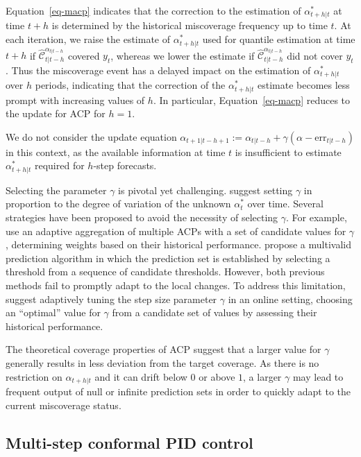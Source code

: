 \documentclass[
  11pt,
  a4paper,
]{article}
\theoremstyle{plain}
\theoremstyle{remark}
\begin{document}
Equation~\ref{eq-macp} indicates that the correction to the estimation
of \(\alpha_{t+h|t}^{*}\) at time \(t+h\) is determined by the
historical miscoverage frequency up to time \(t\). At each iteration, we
raise the estimate of \(\alpha_{t+h|t}^{*}\) used for quantile
estimation at time \(t+h\) if
\(\hat{\mathcal{C}}_{t|t-h}^{\alpha_{t|t-h}}\) covered \(y_t\), whereas
we lower the estimate if \(\hat{\mathcal{C}}_{t|t-h}^{\alpha_{t|t-h}}\)
did not cover \(y_t\). Thus the miscoverage event has a delayed impact
on the estimation of \(\alpha_{t+h|t}^{*}\) over \(h\) periods,
indicating that the correction of the \(\alpha_{t+h|t}^{*}\) estimate
becomes less prompt with increasing values of \(h\). In particular,
Equation~\ref{eq-macp} reduces to the update for ACP for \(h=1\).

We do not consider the update equation
\(\alpha_{t+1|t-h+1} := \alpha_{t|t-h} + \gamma(\alpha - \mathrm{err}_{t|t-h})\)
in this context, as the available information at time \(t\) is
insufficient to estimate \(\alpha_{t+h|t}^{*}\) required for \(h\)-step
forecasts.

Selecting the parameter \(\gamma\) is pivotal yet challenging.
\textcite{gibbs2021} suggest setting \(\gamma\) in proportion to the
degree of variation of the unknown \(\alpha_{t}^{*}\) over time. Several
strategies have been proposed to avoid the necessity of selecting
\(\gamma\). For example, \textcite{zaffran2022} use an adaptive
aggregation of multiple ACPs with a set of candidate values for
\(\gamma\) , determining weights based on their historical performance.
\textcite{bastani2022} propose a multivalid prediction algorithm in
which the prediction set is established by selecting a threshold from a
sequence of candidate thresholds. However, both previous methods fail to
promptly adapt to the local changes. To address this limitation,
\textcite{gibbs2024} suggest adaptively tuning the step size parameter
\(\gamma\) in an online setting, choosing an ``optimal'' value for
\(\gamma\) from a candidate set of values by assessing their historical
performance.

The theoretical coverage properties of ACP suggest that a larger value
for \(\gamma\) generally results in less deviation from the target
coverage. As there is no restriction on \(\alpha_{t+h|t}\) and it can
drift below \(0\) or above \(1\), a larger \(\gamma\) may lead to
frequent output of null or infinite prediction sets in order to quickly
adapt to the current miscoverage status.

\subsection{Multi-step conformal PID
control}\label{multi-step-conformal-pid-control}
\end{document}
